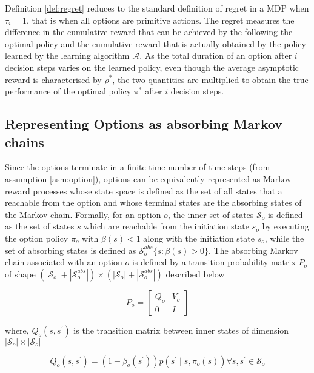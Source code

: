 Definition \ref{def:regret} reduces to the standard definition of regret in a MDP when $\tau_i = 1$, that is when all options are primitive actions.
The regret measures the difference in the cumulative reward that can be achieved by the following the optimal policy and the cumulative reward that is actually obtained by the policy learned by the learning algorithm $\mathcal{A}$.
As the total duration of an option after $i$ decision steps varies on the learned policy, even though the average asymptotic reward is characterised by $\rho^*$, the two quantities are multiplied to obtain the true performance of the optimal policy $\pi^*$ after $i$ decision steps.

\subsection{Representing Options as absorbing Markov chains} \label{sec:trueP0}

Since the options terminate in a finite time number of time steps (from assumption \ref{asm:option}), options can be equivalently represented as Markov reward processes whose state space is defined as the set of all states that a reachable from the option and whose terminal states are the absorbing states of the Markov chain.
Formally, for an option $o$, the inner set of states $\mathcal{S}_o$ is defined as the set of states $s$ which are reachable from the initiation state $s_o$ by executing the option policy $\pi_o$ with $\beta(s) < 1$ along with the initiation state $s_o$, while the set of absorbing states is defined as $\mathcal{S}_o^{abs}\{s : \beta(s) > 0\}$.
The absorbing Markov chain associated with an option $o$ is defined by a transition probability matrix $P_o$ of shape $(|\mathcal{S}_o| + |\mathcal{S}_o^{abs}|) \times (|\mathcal{S}_o| + |\mathcal{S}_o^{abs}|)$ described below

\begin{equation}
    P_o = \begin{bmatrix}
       Q_o & V_o \\
       0 & I
    \end{bmatrix}
\end{equation}

where, $Q_o(s, s^\prime)$ is the transition matrix between inner states of dimension $|\mathcal{S}_o| \times |\mathcal{S}_o|$

\begin{equation}
    Q_o(s, s^\prime) = (1 - \beta_o(s^\prime)) p(s^\prime \mid s, \pi_o(s)) \forall s, s^\prime \in \mathcal{S}_o
\end{equation}

